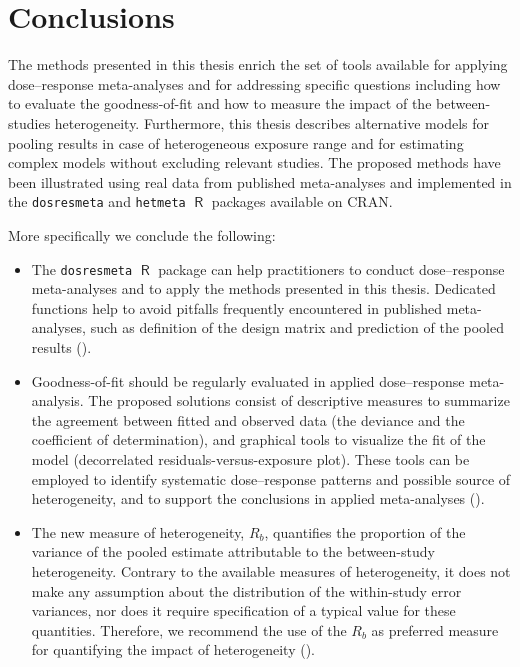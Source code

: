 \documentclass[11pt,a4paper,twoside,openany]{book}\usepackage{knitr}
\DeclareMathOperator{\R}{\textsf{R}}
\begin{document}
{%

%

\chapter{Conclusions}

The methods presented in this thesis enrich the set of tools available for applying dose--response meta-analyses and for addressing specific questions including how to evaluate the goodness-of-fit and how to measure the impact of the between-studies heterogeneity. Furthermore, this thesis describes alternative models for pooling results in case of heterogeneous exposure range and for estimating complex models without excluding relevant studies. The proposed methods have been illustrated using real data from published meta-analyses and implemented in the \texttt{dosresmeta} and \texttt{hetmeta} $\R$ packages available on CRAN. 

More specifically we conclude the following:

\begin{itemize}

\item The \texttt{dosresmeta} $\R$ package can help practitioners to conduct dose--response meta-analyses and to apply the methods presented in this thesis. Dedicated functions help to avoid pitfalls frequently encountered in published meta-analyses, such as definition of the design matrix and prediction of the pooled results ().

\item Goodness-of-fit should be regularly evaluated in applied dose--response meta-analysis. The proposed solutions consist of descriptive measures to summarize the agreement between fitted and observed data (the deviance and the coefficient of determination), and graphical tools to visualize the fit of the model (decorrelated residuals-versus-exposure plot). These tools can be employed to identify systematic dose--response patterns and possible source of heterogeneity, and to support the conclusions in applied meta-analyses ().

\item The new measure of heterogeneity, $R_b$, quantifies the proportion of the variance of the pooled estimate attributable to the between-study heterogeneity. Contrary to the available measures of heterogeneity, it does not make any assumption about the distribution of the within-study error variances, nor does it require specification of a typical value for these quantities. Therefore, we recommend the use of the $R_b$ as preferred measure for quantifying the impact of heterogeneity (). 


\end{itemize}}
\end{document}
